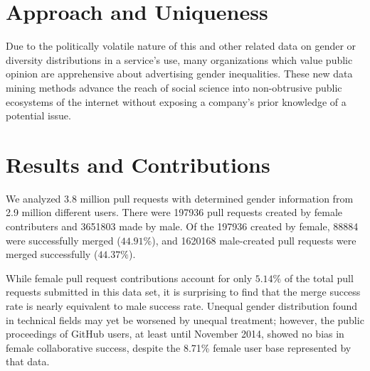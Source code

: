 \documentclass{sigplanconf}
\begin{document}
\section{Approach and Uniqueness}
Due to the politically volatile nature of this and other related data on gender
or diversity distributions in a service's use, many organizations which value
public opinion are apprehensive about advertising gender inequalities. These new data
mining methods advance the reach of social science into non-obtrusive public
ecosystems of the internet without exposing a company's prior knowledge of a
potential issue.

\section{Results and Contributions}
We analyzed 3.8 million pull requests with determined gender information from
2.9 million different users. There were 197936 pull requests created by female contributers and 3651803 made by
male. Of the 197936 created by female, 88884 were successfully merged
($44.91\%$), and 1620168 male-created pull requests
were merged successfully ($44.37\%$).

While female pull request contributions account for only $5.14\%$ of the total pull
requests submitted in this data set, it is surprising to find that the merge
success rate is nearly equivalent to male success rate. Unequal gender
distribution found in technical fields may yet be worsened by unequal treatment;
however, the public proceedings of GitHub users, at least until November 2014,
showed no bias in female collaborative success, despite the 8.71\% female
user base represented by that data.


\acks




\renewcommand{\bibfont}{\normalsize}


\begin{thebibliography}
\softraggedright


\end{thebibliography}
\end{document}
